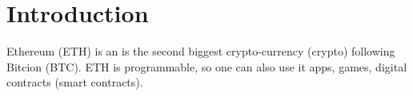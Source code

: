 \chapter{Introduction}
\label{intro}

Ethereum (ETH) is an is the second biggest crypto-currency (crypto) following Bitcion (BTC). ETH is programmable, so one can also use it apps, games, digital contracts (smart contracts).